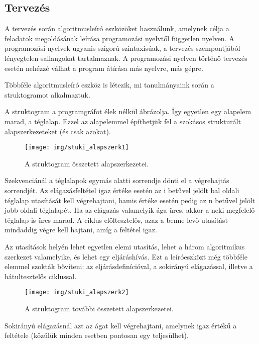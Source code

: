\documentclass[margin=0px]{article}
\begin{document}
	\subsection{Tervezés}
	
	A tervezés során algoritmusleíró eszközöket használunk, amelynek célja a feladatok megoldásának leírása programozási nyelvtől független nyelven. A programozási nyelvek ugyanis szigorú szintaxisúak, a tervezés szempontjából lényegtelen sallangokat tartalmaznak. A programozási nyelven történő tervezés esetén nehézzé válhat a program átírása más nyelvre, más gépre.
	
	Többféle algoritmusleíró eszköz is létezik, mi tanulmányaink során a struktogramot alkalmaztuk.
	
	A struktogram a programgráfot élek nélkül ábrázolja. Így egyetlen egy alapelem marad, a téglalap. Ezzel az alapelemmel építhetjük fel a szokásos strukturált alapszerkezeteket (és csak azokat).

		\begin{figure}[H]
			\centering
			\texttt{[image: img/stuki\_alapszerk1]}
			\caption{A struktogram összetett alapszerkezetei.}
			\label{fig:stuki_alapszerk1}
		\end{figure}

	Szekvenciánál a téglalapok egymás alatti sorrendje dönti el a végrehajtás sorrendjét. Az elágazásfeltétel igaz értéke esetén az i betűvel jelölt bal oldali téglalap utasítását kell végrehajtani, hamis értéke esetén pedig az n betűvel jelölt jobb oldali téglalapét. Ha az elágazás valamelyik ága üres, akkor a neki megfelelő téglalap is üres marad. A ciklus elöltesztelős, azaz a benne levő utasítást mindaddig végre kell hajtani, amíg a feltétel igaz.
	
	Az utasítások helyén lehet egyetlen elemi utasítás, lehet a három algoritmikus szerkezet valamelyike, és lehet egy eljáráshívás. Ezt a leíróeszközt még többféle elemmel szokták bővíteni: az eljárásdefinícióval, a sokirányú elágazással, illetve a hátultesztelős ciklussal.
	
		\begin{figure}[H]
			\centering
			\texttt{[image: img/stuki\_alapszerk2]}
			\caption{A struktogram további összetett alapszerkezetei.}
			\label{fig:stuki_alapszerk2}
		\end{figure}
	
	\noindent Sokirányú elágazásnál azt az ágat kell végrehajtani, amelynek igaz értékű a feltétele (közülük minden esetben pontosan egy teljesülhet).\\
	
\end{document}
